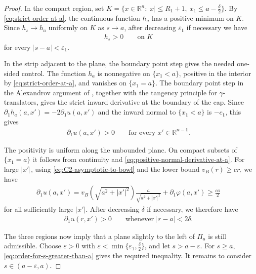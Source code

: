 \documentclass{amsart}
\theoremstyle{plain}
\theoremstyle{mainintrothm}
\theoremstyle{definition}
\begin{document}
\begin{proof}
	\medskip
	
	In the compact region, set
	$K=\{x\in\mathbb R^n: |x|\le R_1+1,\ x_1\le a-\frac{\delta}{2}\}$.
	By \eqref{eq:strict-order-at-a}, the continuous function $h_a$ has a
	positive minimum on $K$.  Since $h_s\to h_a$ uniformly on $K$ as $s\to a$,
	after decreasing $\varepsilon_1$ if necessary we have
	\begin{align}
		\label{eq:inside-ball-order-near-a}
		h_s>0
		\qquad
		\text{on }K
	\end{align}
	for every $|s-a|<\varepsilon_1$.
	
	\medskip
	
	In the strip adjacent to the plane, the boundary point step gives the needed
	one-sided control.  The function $h_a$ is nonnegative on $\{x_1<a\}$,
	positive in the interior by \eqref{eq:strict-order-at-a}, and vanishes on
	$\{x_1=a\}$.  The boundary point step in the Alexandrov argument of
	\cite{Paco_2014}, together with the tangency principle for
	$\gamma$-translators, gives the strict inward derivative at the boundary of
	the cap.  Since $\partial_1h_a(a,x')=-2\partial_1u(a,x')$ and the inward
	normal to $\{x_1<a\}$ is $-e_1$, this gives
	\begin{align}
		\label{eq:positive-normal-derivative-at-a}
		\partial_1u(a,x')>0
		\qquad
		\text{for every }x'\in\mathbb R^{n-1}.
	\end{align}
	
	\medskip
	
	The positivity is uniform along the unbounded plane.  On compact subsets of
	$\{x_1=a\}$ it follows from continuity and
	\eqref{eq:positive-normal-derivative-at-a}.  For large $|x'|$, using
	\eqref{eq:C2-asymptotic-to-bowl} and the lower bound $v_B(r)\ge cr$, we have
	\begin{align*}
		\partial_1u(a,x')
		=
		v_B\left(\sqrt{a^2+|x'|^2}\right)
		\frac{a}{\sqrt{a^2+|x'|^2}}
		+
		\partial_1\varphi(a,x')
		\ge
		\frac{ca}{2}
	\end{align*}
	for all sufficiently large $|x'|$.  After decreasing $\delta$ if necessary,
	we therefore have
	\begin{align}
		\label{eq:positive-derivative-strip-near-a}
		\partial_1u(r,x')>0
		\qquad
		\text{whenever } |r-a|<2\delta .
	\end{align}
	
	\medskip
	
	The three regions now imply that a plane slightly to the left of $\Pi_a$ is
	still admissible.  Choose $\varepsilon>0$ with
	$\varepsilon<\min\{\varepsilon_1,\frac{\delta}{2}\}$, and let
	$s>a-\varepsilon$.  For $s\ge a$, \eqref{eq:order-for-s-greater-than-a}
	gives the required inequality.  It remains to consider
	$s\in(a-\varepsilon,a)$.
	

\end{proof}
\end{document}
